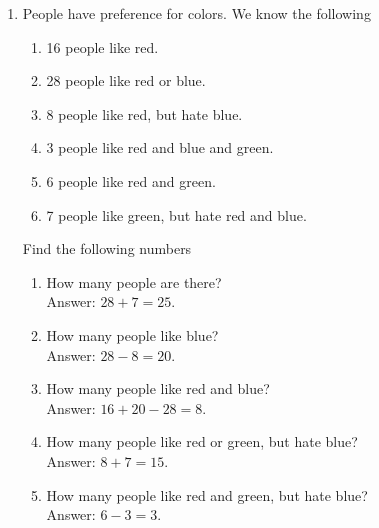 \documentclass[11pt]{article}
\begin{document}
\begin{enumerate}
\item People have preference for colors. We know the following
\begin{enumerate}
    \item 16 people like red.
    \item 28 people like red or blue.
    \item 8 people like red, but hate blue.
    \item 3 people like red and blue and green.
    \item 6 people like red and green.
    \item 7 people like green, but hate red and blue.
\end{enumerate}
Find the following numbers
\begin{enumerate}
    \item How many people are there?\\
    Answer: $28 + 7 = 25$.
    \item How many people like blue?\\
    Answer: $28 - 8 = 20$.
    \item How many people like red and blue?\\
    Answer: $16 + 20 - 28 = 8$.
    \item How many people like red or green, but hate blue?\\
    Answer: $8 + 7 = 15$.
    \item How many people like red and green, but hate blue?\\
    Answer: $6 - 3 = 3$.
\end{enumerate}




\end{enumerate}
\end{document}
